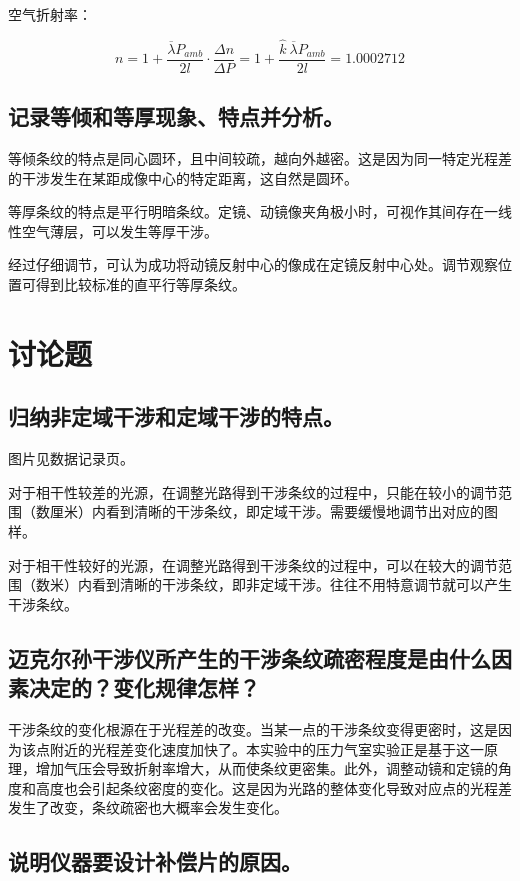 \documentclass{ctexart}
\begin{document}
空气折射率：

$$ n = 1 + \frac{\overline{\lambda} P_{amb}}{2l}\cdot \frac{\Delta n}{\Delta P} = 1 + \frac{\widehat{k} \ \overline{\lambda} P_{amb}}{2l} = 1.0002712 $$

\subsection{记录等倾和等厚现象、特点并分析。}

等倾条纹的特点是同心圆环，且中间较疏，越向外越密。这是因为同一特定光程差的干涉发生在某距成像中心的特定距离，这自然是圆环。 

等厚条纹的特点是平行明暗条纹。定镜、动镜像夹角极小时，可视作其间存在一线性空气薄层，可以发生等厚干涉。                                                               

经过仔细调节，可认为成功将动镜反射中心的像成在定镜反射中心处。调节观察位置可得到比较标准的直平行等厚条纹。 

\section{讨论题}

\subsection{归纳非定域干涉和定域干涉的特点。}

图片见数据记录页。

对于相干性较差的光源，在调整光路得到干涉条纹的过程中，只能在较小的调节范围（数厘米）内看到清晰的干涉条纹，即定域干涉。需要缓慢地调节出对应的图样。 

对于相干性较好的光源，在调整光路得到干涉条纹的过程中，可以在较大的调节范围（数米）内看到清晰的干涉条纹，即非定域干涉。往往不用特意调节就可以产生干涉条纹。 

\subsection{迈克尔孙干涉仪所产生的干涉条纹疏密程度是由什么因素决定的？变化规律怎样？}

干涉条纹的变化根源在于光程差的改变。当某一点的干涉条纹变得更密时，这是因为该点附近的光程差变化速度加快了。本实验中的压力气室实验正是基于这一原理，增加气压会导致折射率增大，从而使条纹更密集。此外，调整动镜和定镜的角度和高度也会引起条纹密度的变化。这是因为光路的整体变化导致对应点的光程差发生了改变，条纹疏密也大概率会发生变化。
\subsection{说明仪器要设计补偿片的原因。}
\end{document}
